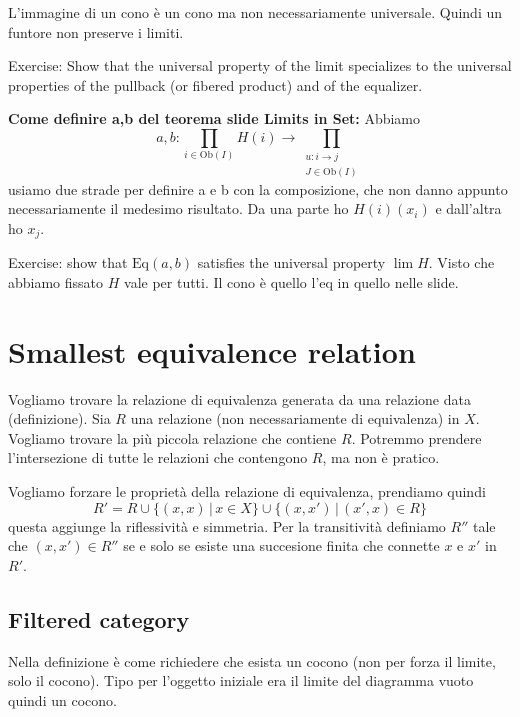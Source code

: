 \documentclass[a4paper]{article}
\begin{document}
L'immagine di un cono è un cono ma non necessariamente universale.
Quindi un funtore non preserve i limiti.

Exercise: Show that the universal property of the limit specializes
to the universal properties of the pullback (or fibered product) and of the equalizer.

\textbf{Come definire a,b del teorema slide Limits in Set:}
Abbiamo
\[
    a,b \colon \prod_{i \in \text{Ob}(I)} H(i)
    \to \prod_{\substack{u \colon i \to j \\ J \in \text{Ob}(I)}}
\]
usiamo due strade per definire a e b con la composizione, che non danno appunto necessariamente
il medesimo risultato. Da una parte ho \(H(i)(x_i)\) e dall'altra ho \(x_j\).

Exercise: show that \(\text{Eq}(a,b)\) satisfies
the universal property \(\lim H\).
Visto che abbiamo fissato \(H\) vale per tutti.
Il cono è quello l'eq in quello nelle slide.

\section{Smallest equivalence relation}

Vogliamo trovare la relazione di equivalenza
generata da una relazione data (definizione).
Sia \(R\) una relazione (non necessariamente di equivalenza) in \(X\).
Vogliamo trovare la più piccola relazione che contiene \(R\).
Potremmo prendere l'intersezione di tutte le relazioni che
contengono \(R\), ma non è pratico.

Vogliamo forzare le proprietà della relazione di equivalenza, prendiamo quindi
\[
    R' = R \cup \{(x,x) \,|\, x\in X\}
    \cup \{(x,x') \,|\, (x', x) \in R\}
\]
questa aggiunge la riflessività e simmetria.
Per la transitività definiamo
\(R''\) tale che \((x, x') \in R''\)
se e solo se esiste una succesione finita che connette \(x\) e \(x'\)
in \(R'\).

\subsection{Filtered category}

Nella definizione è come richiedere che esista un cocono (non per forza il limite, solo il cocono).
Tipo per l'oggetto iniziale era il limite del diagramma vuoto quindi un cocono.

\end{document}
